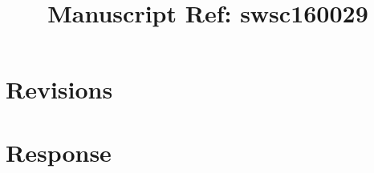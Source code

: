 \documentclass{article}
\begin{document}
\title{Manuscript Ref: swsc160029}
\maketitle
\section{Revisions}

\section{Response}
\end{document}
